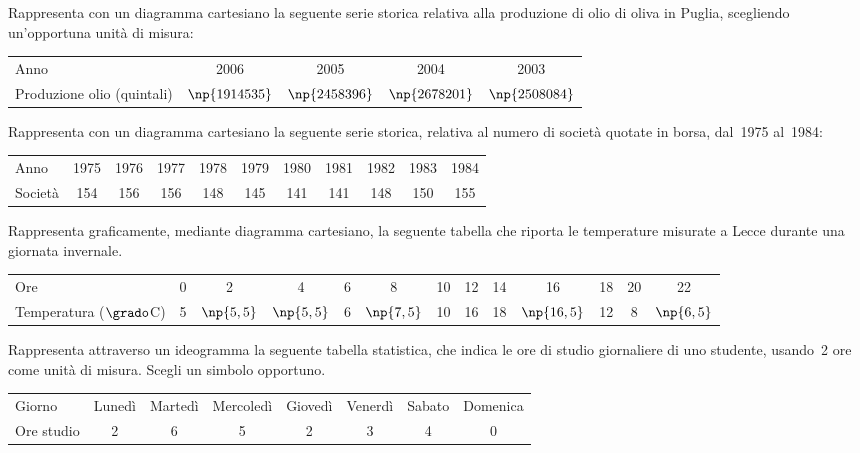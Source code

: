 \begin{esercizio}
\label{ese:A.10}
Rappresenta con un diagramma cartesiano la seguente serie storica relativa alla produzione di olio di oliva in Puglia,
scegliendo un'opportuna unità di misura:
\begin{center}
 \begin{tabular}{lcccc}
\toprule
Anno & 2006 & 2005 & 2004 & 2003\\
Produzione olio (quintali) & $\np{1914535}$ & $\np{2458396}$ & $\np{2678201}$ & $\np{2508084}$\\
\bottomrule
\end{tabular}
\end{center}
\end{esercizio}

\begin{esercizio}
\label{ese:A.11}
Rappresenta con un diagramma cartesiano la seguente serie storica, relativa al numero di società quotate in borsa, dal~1975 al~1984:
\begin{center}
 \begin{tabular}{lcccccccccc}
\toprule
Anno & 1975 & 1976 & 1977 & 1978 & 1979 & 1980 & 1981 & 1982 & 1983 & 1984 \\
Società & 154 & 156 & 156 & 148 & 145 & 141 & 141 & 148 & 150 & 155 \\
\bottomrule
\end{tabular}
\end{center}
\end{esercizio}

\begin{esercizio}
\label{ese:A.12}
Rappresenta graficamente, mediante diagramma cartesiano, la seguente tabella che riporta le temperature misurate a Lecce durante una giornata invernale.
\begin{center}
\begin{tabularx}{.95\textwidth}{X*{12}{c}}
\toprule
Ore                     & 0 &   2   &   4   & 6 &   8   & 10 & 12 & 14 &   16   & 18 & 20 &  22\\
Temperatura ($\grado$C) & 5 & $\np{5,5}$ & $\np{5,5}$ & 6 & $\np{7,5}$ & 10 & 16 & 18 & $\np{16,5}$ & 12 & 8  & $\np{6,5}$\\
\bottomrule
\end{tabularx}
\end{center}
\end{esercizio}


\begin{esercizio}
\label{ese:A.13}
Rappresenta attraverso un ideogramma la seguente tabella statistica, che indica le ore di studio giornaliere di uno studente,
usando~2 ore come unità di misura. Scegli un simbolo opportuno.
\begin{center}
\begin{tabular}{l*{7}{c}}
\toprule
Giorno & Lunedì & Martedì & Mercoledì & Giovedì & Venerdì & Sabato & Domenica \\
Ore studio & 2 & 6 & 5 & 2 & 3 & 4 & 0 \\
\bottomrule
\end{tabular}
\end{center}
\end{esercizio}

